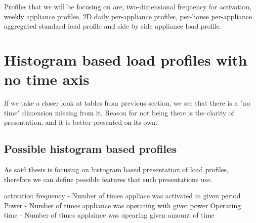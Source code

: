 Profiles that we will be focusing on are, two-dimensional
frequency for activation, weekly appliance profiles, 
2D daily per-appliance profiles, per-house per-appliance 
aggregated standard load profile and side by side appliance load profile.



\section{Histogram based load profiles with no time axis}

If we take a closer look at tables from previous section, 
we see that there is a "no time" dimension missing from it. 
Reason for not being there is the clarity of presentation,
and it is better presented on its own.

\subsection{Possible histogram based profiles}

As said thesis is focusing on histogram based presentation of load profiles,
therefore we can define possible features that such presentations use. 

\begin{outline}
\1 activation frequency - Number of times appliace was activated in given period
\1 Power - Number of times appliance was operating with giver power 
\1 Operating time - Number of times applaince was opearing given amount of time
\
\end{outline}

